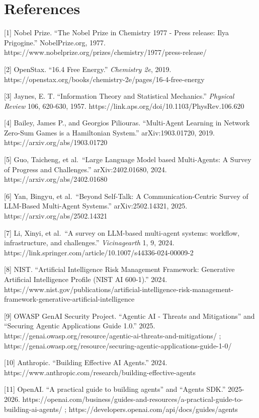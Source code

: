 \section{References}\label{references}

{[}1{]} Nobel Prize. ``The Nobel Prize in Chemistry 1977 - Press
release: Ilya Prigogine.'' NobelPrize.org, 1977.
https://www.nobelprize.org/prizes/chemistry/1977/press-release/

{[}2{]} OpenStax. ``16.4 Free Energy.'' \emph{Chemistry 2e}, 2019.
https://openstax.org/books/chemistry-2e/pages/16-4-free-energy

{[}3{]} Jaynes, E. T. ``Information Theory and Statistical Mechanics.''
\emph{Physical Review} 106, 620-630, 1957.
https://link.aps.org/doi/10.1103/PhysRev.106.620

{[}4{]} Bailey, James P., and Georgios Piliouras. ``Multi-Agent Learning
in Network Zero-Sum Games is a Hamiltonian System.'' arXiv:1903.01720,
2019. https://arxiv.org/abs/1903.01720

{[}5{]} Guo, Taicheng, et al.~``Large Language Model based Multi-Agents:
A Survey of Progress and Challenges.'' arXiv:2402.01680, 2024.
https://arxiv.org/abs/2402.01680

{[}6{]} Yan, Bingyu, et al.~``Beyond Self-Talk: A Communication-Centric
Survey of LLM-Based Multi-Agent Systems.'' arXiv:2502.14321, 2025.
https://arxiv.org/abs/2502.14321

{[}7{]} Li, Xinyi, et al.~``A survey on LLM-based multi-agent systems:
workflow, infrastructure, and challenges.'' \emph{Vicinagearth} 1, 9,
2024. https://link.springer.com/article/10.1007/s44336-024-00009-2

{[}8{]} NIST. ``Artificial Intelligence Risk Management Framework:
Generative Artificial Intelligence Profile (NIST AI 600-1).'' 2024.
https://www.nist.gov/publications/artificial-intelligence-risk-management-framework-generative-artificial-intelligence

{[}9{]} OWASP GenAI Security Project. ``Agentic AI - Threats and
Mitigations'' and ``Securing Agentic Applications Guide 1.0.'' 2025.
https://genai.owasp.org/resource/agentic-ai-threats-and-mitigations/ ;
https://genai.owasp.org/resource/securing-agentic-applications-guide-1-0/

{[}10{]} Anthropic. ``Building Effective AI Agents.'' 2024.
https://www.anthropic.com/research/building-effective-agents

{[}11{]} OpenAI. ``A practical guide to building agents'' and ``Agents
SDK.'' 2025-2026.
https://openai.com/business/guides-and-resources/a-practical-guide-to-building-ai-agents/
; https://developers.openai.com/api/docs/guides/agents

